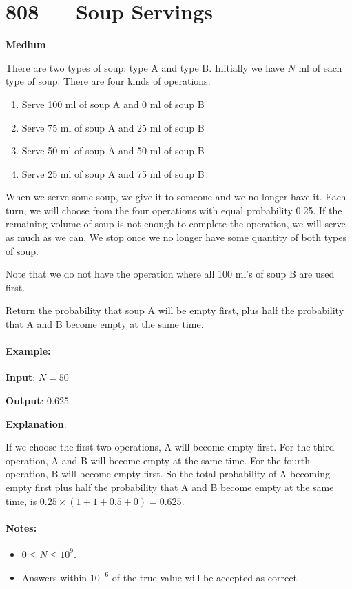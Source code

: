 \section{808 --- Soup Servings}

\textbf{Medium}

There are two types of soup: type A and type B. Initially we have $N$ ml of each type of soup. There are four kinds of operations:

\begin{enumerate}
\item Serve 100 ml of soup A and 0 ml of soup B

\item Serve 75 ml of soup A and 25 ml of soup B

\item Serve 50 ml of soup A and 50 ml of soup B

\item Serve 25 ml of soup A and 75 ml of soup B
\end{enumerate}

When we serve some soup, we give it to someone and we no longer have it.  Each turn, we will choose from the four operations with equal probability 0.25. If the remaining volume of soup is not enough to complete the operation, we will serve as much as we can.  We stop once we no longer have some quantity of both types of soup.

Note that we do not have the operation where all 100 ml's of soup B are used first.  

Return the probability that soup A will be empty first, plus half the probability that A and B become empty at the same time.
 

\paragraph{Example:}

\begin{flushleft}
\textbf{Input}: $ N = 50 $

\textbf{Output}: 0.625

\textbf{Explanation}: 

If we choose the first two operations, A will become empty first. For the third operation, A and B will become empty at the same time. For the fourth operation, B will become empty first. So the total probability of A becoming empty first plus half the probability that A and B become empty at the same time, is $ 0.25 \times (1 + 1 + 0.5 + 0) = 0.625 $.
\end{flushleft}

\paragraph{Notes:}

\begin{itemize}
\item $0 \leq N \leq 10^9$. 
\item Answers within $10^{-6}$ of the true value will be accepted as correct.
\end{itemize}